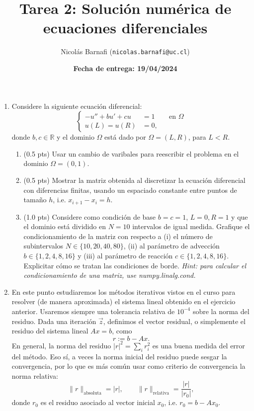 \documentclass{article}
\title{Tarea 2: Solución numérica de ecuaciones diferenciales}
\author{Nicolás Barnafi (\texttt{nicolas.barnafi@uc.cl})}
\date{\textbf{Fecha de entrega: 19/04/2024}}
\begin{document}
\maketitle

\begin{enumerate}
    \item Considere la siguiente ecuación diferencial: 
        $$
            \left\lbrace\begin{aligned}
                - u'' + b u' + c u &= 1 && \text{en $\Omega$}\\
                u(L) = u(R) &= 0,
            \end{aligned}\right.
        $$
        donde $b,c\in \mathbb R$ y el dominio $\Omega$ está dado por $\Omega = (L, R)$, para $ L < R$. 
        \begin{enumerate}
            \item (0.5 pts) Usar un cambio de varibales para reescribir el problema en el dominio $\Omega = (0,1)$.
            \item (0.5 pts) Mostrar la matriz obtenida al discretizar la ecuación diferencial con diferencias finitas, usando un espaciado constante entre puntos de tamaño $h$, i.e. $x_{i+1} - x_i = h$.
            \item (1.0 pts) Considere como condición de base $b=c=1$, $L=0, R=1$ y que el dominio está dividido en $N=10$ intervalos de igual medida. Grafique el condicionamiento de la matriz con respecto a (i) el número de subintervalos $N\in \{10,20,40,80\}$, (ii) al parámetro de advección $b \in\{1, 2, 4, 8, 16\}$ y (iii) al parámetro de reacción $c\in\{1, 2, 4, 8, 16\}$. Explicitar cómo se tratan las condiciones de borde. \textit{Hint: para calcular el condicionamiento de una matriz, use numpy.linalg.cond.}
        \end{enumerate} 

    \item En este punto estudiaremos los métodos iterativos vistos en el curso para resolver (de manera aproximada) el sistema lineal obtenido en el ejercicio anterior. Usaremos siempre una tolerancia relativa de $10^{-4}$ sobre la norma del residuo. Dada una iteración $\vec z$, definimos el vector residual, o simplemente el residuo del sistema lineal $Ax = b$, como 
            $$ r := b - Ax. $$
    En general, la norma del residuo $|r|^2 = \sum_i r_i^2$ es una buena medida del error del método. Eso sí, a veces la norma inicial del residuo puede sesgar la convergencia, por lo que es más común usar como criterio de convergencia la norma relativa: 
        $$ \|r\|_\text{absoluta} = |r|, \qquad \|r\|_\text{relativa} = \frac{|r|}{|r_0|}, $$
    donde $r_0$ es el residuo asociado al vector inicial $x_0$, i.e. $r_0 = b - Ax_0$. 


\end{enumerate}
\end{document}

